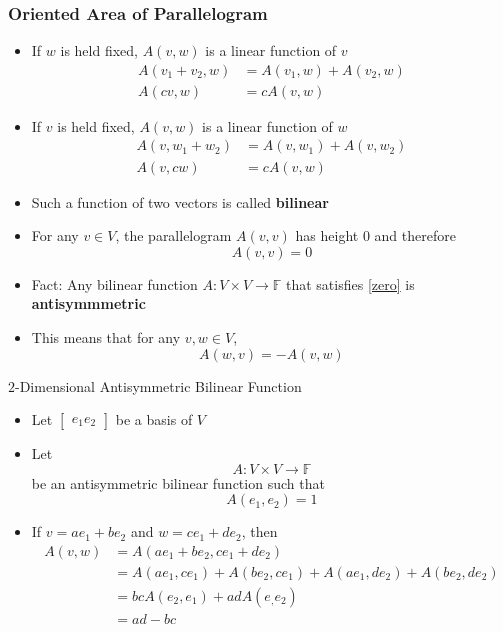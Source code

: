 \documentclass[usenames,dvipsnames,10pt]{beamer}
\newcommand\F{\mathbb{F}}
\begin{document}
\begin{frame}
  \frametitle{Oriented Area of Parallelogram}

  \begin{itemize}
  \item If $w$ is held fixed, $A(v,w)$ is a linear function of $v$
    \begin{align*}
      A(v_1+v_2,w) &= A(v_1,w) + A(v_2,w)\\
      A(cv,w) &= cA(v,w)
    \end{align*}
  \item If $v$ is held fixed, $A(v,w)$ is a linear function of $w$
    \begin{align*}
      A(v,w_1+w_2) &= A(v,w_1) + A(v,w_2)\\
      A(v,cw) &= cA(v,w)
    \end{align*}
  \item Such a function of two vectors is called {\bf bilinear}    
  \item For any $v \in V$, the parallelogram $A(v,v)$ has height $0$ and therefore
    \begin{equation}\label{zero}
      A(v,v) = 0
    \end{equation}
  \item Fact: Any bilinear function $A: V\times V \rightarrow \F$ that satisfies \eqref{zero} is {\bf antisymmmetric}
  \item This means that for any $v, w \in V$,
    \[
      A(w,v) = -A(v,w)
    \]
  \end{itemize}
\end{frame}

\begin{frame}
  {$2$-Dimensional Antisymmetric Bilinear Function}

  \begin{itemize}
  \item Let $\begin{bmatrix} e_1 e_2 \end{bmatrix}$ be a basis of $V$
  \item Let
    \[ A: V\times V \rightarrow \F \]
    be an antisymmetric bilinear function such that
    \[ A(e_1,e_2)=1 \]
  \item If $v = ae_1+be_2$ and $w = ce_1+de_2$, then
    \begin{align*}
      A(v,w) &= A(ae_1 + be_2, ce_1 + de_2)\\
             &= A(ae_1,ce_1) + A(be_2,ce_1) + A(ae_1,de_2) + A(be_2,de_2)\\
             &= bcA(e_2,e_1) + adA(e_,e_2)\\
             &= ad-bc
    \end{align*}
  \end{itemize}
\end{frame}
\end{document}
